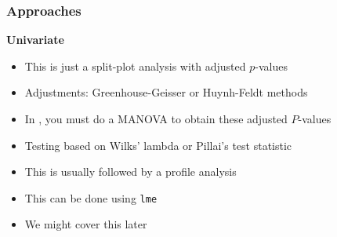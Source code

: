 \documentclass[color=usenames,dvipsnames]{beamer}\usepackage[]{graphicx}\usepackage[]{color}
\newcommand{\inr}[1]{\colorbox{inlinecolor}{\texttt{#1}}}
\begin{document}
\begin{frame}[fragile]
   \frametitle{Approaches}
   \Large
      \large
      {\bf Univariate}
        \begin{itemize}
        \normalsize
          \item<1-> This is just a split-plot analysis with adjusted $p$-values
          \item<2-> Adjustments: Greenhouse-Geisser or Huynh-Feldt methods
          \item<3-> In \R, you must do a MANOVA to obtain these adjusted $P$-values
        \end{itemize}
      \vfill
        \begin{itemize}
          \large
          \item<5-> Testing based on Wilks' lambda or Pillai's test statistic
          \item<5-> This is usually followed by a profile analysis
        \end{itemize}
      \vfill
        \begin{itemize}
        \item<7-> This can be done using \inr{lme}
        \item<7-> We might cover this later%
      \end{itemize}
\end{frame}
\end{document}
